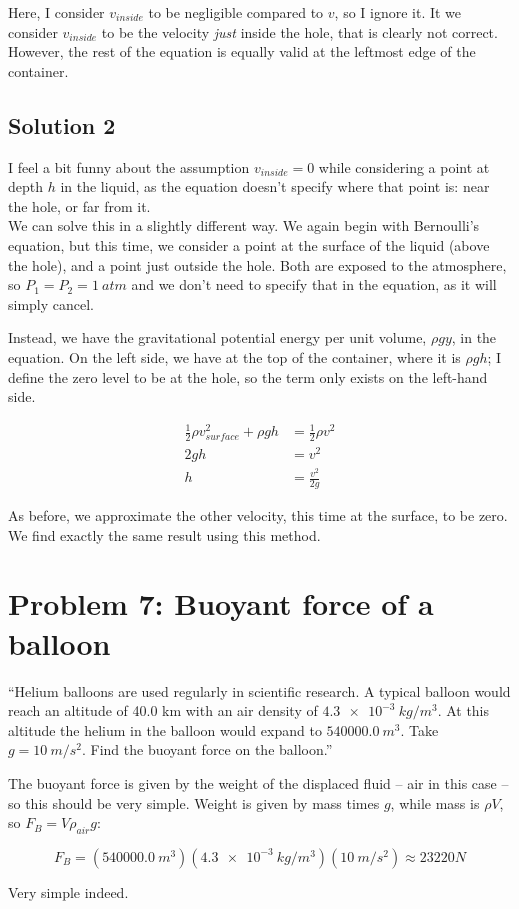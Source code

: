 \documentclass[8.01x]{subfiles}
\begin{document}
Here, I consider $v_{inside}$ to be negligible compared to $v$, so I ignore it. It we consider $v_{inside}$ to be the velocity \emph{just} inside the hole, that is clearly not correct. However, the rest of the equation is equally valid at the leftmost edge of the container.

\subsection{Solution 2}

I feel a bit funny about the assumption $v_{inside} = 0$ while considering a point at depth $h$ in the liquid, as the equation doesn't specify where that point is: near the hole, or far from it.\\
We can solve this in a slightly different way. We again begin with Bernoulli's equation, but this time, we consider a point at the surface of the liquid (above the hole), and a point just outside the hole. Both are exposed to the atmosphere, so $P_1 = P_2 = \SI{1}{atm}$ and we don't need to specify that in the equation, as it will simply cancel.

Instead, we have the gravitational potential energy per unit volume, $\rho g y$, in the equation. On the left side, we have at the top of the container, where it is $\rho g h$; I define the zero level to be at the hole, so the term only exists on the left-hand side.

\begin{align}
\frac{1}{2} \rho v_{surface}^2 + \rho g h &= \frac{1}{2} \rho v^2\\
2 g h &= v^2\\
h &= \frac{v^2}{2 g}
\end{align}

As before, we approximate the other velocity, this time at the surface, to be zero. We find exactly the same result using this method.

\section{Problem 7: Buoyant force of a balloon}

``Helium balloons are used regularly in scientific research. A typical balloon would reach an altitude of 40.0 km with an air density of $\SI{4.3e-3}{kg/m^3}$. At this altitude the helium in the balloon would expand to $\SI{540000.0}{m^3}$. Take $g = \SI{10}{m/s^2}$. Find the buoyant force on the balloon.''

The buoyant force is given by the weight of the displaced fluid -- air in this case -- so this should be very simple. Weight is given by mass times $g$, while mass is $\rho V$, so $F_B = V \rho_{air} g$:

\begin{equation}
F_B = (\SI{540000.0}{m^3})(\SI{4.3e-3}{kg/m^3})(\SI{10}{m/s^2}) \approx 23220 N
\end{equation}

Very simple indeed.
\end{document}
